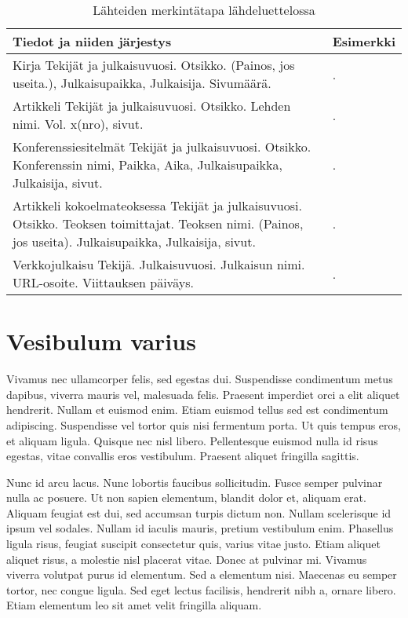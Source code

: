 \begin{table}
\caption{Lähteiden merkintätapa lähdeluettelossa}
\label{table:bibliography}
\begin{center}
\begin{tabular}{ | p{7cm} | p{7cm} | }
	\hline
	\textbf{Tiedot ja niiden järjestys} & \textbf{Esimerkki} \\ \hline
	Kirja \newline 	Tekijät ja julkaisuvuosi. Otsikko. (Painos, jos useita.), Julkaisupaikka, Julkaisija. Sivumäärä. & \fullcite{basar1995dynamic}. \\ \hline
	Artikkeli \newline Tekijät ja julkaisuvuosi. Otsikko. Lehden nimi. Vol. x(nro), sivut. & \fullcite{umble2003enterprise}. \\ \hline
	Konferenssiesitelmät \newline Tekijät ja julkaisuvuosi. Otsikko. Konferenssin nimi, Paikka, Aika, Julkaisupaikka, Julkaisija, sivut. & \fullcite{somers2001impact}. \\ \hline 
	Artikkeli kokoelmateoksessa \newline Tekijät ja julkaisuvuosi. Otsikko. Teoksen toimittajat. Teoksen nimi. (Painos, jos useita). Julkaisupaikka, Julkaisija, sivut. & \fullcite{knuth1973fundamental}. \\ \hline
	Verkkojulkaisu \newline Tekijä. Julkaisuvuosi. Julkaisun nimi. URL-osoite. Viittauksen päiväys. & \fullcite{lehman2014biblatex}. \\
	\hline
\end{tabular}
\end{center}
\end{table}

\section{Vesibulum varius}

Vivamus nec ullamcorper felis, sed egestas dui. Suspendisse condimentum metus dapibus, viverra mauris vel, malesuada felis. Praesent imperdiet orci a elit aliquet hendrerit. Nullam et euismod enim. Etiam euismod tellus sed est condimentum adipiscing. Suspendisse vel tortor quis nisi fermentum porta. Ut quis tempus eros, et aliquam ligula. Quisque nec nisl libero. Pellentesque euismod nulla id risus egestas, vitae convallis eros vestibulum. Praesent aliquet fringilla sagittis.

Nunc id arcu lacus. Nunc lobortis faucibus sollicitudin. Fusce semper pulvinar nulla ac posuere. Ut non sapien elementum, blandit dolor et, aliquam erat. Aliquam feugiat est dui, sed accumsan turpis dictum non. Nullam scelerisque id ipsum vel sodales. Nullam id iaculis mauris, pretium vestibulum enim. Phasellus ligula risus, feugiat suscipit consectetur quis, varius vitae justo. Etiam aliquet aliquet risus, a molestie nisl placerat vitae. Donec at pulvinar mi. Vivamus viverra volutpat purus id elementum. Sed a elementum nisi. Maecenas eu semper tortor, nec congue ligula. Sed eget lectus facilisis, hendrerit nibh a, ornare libero. Etiam elementum leo sit amet velit fringilla aliquam.

